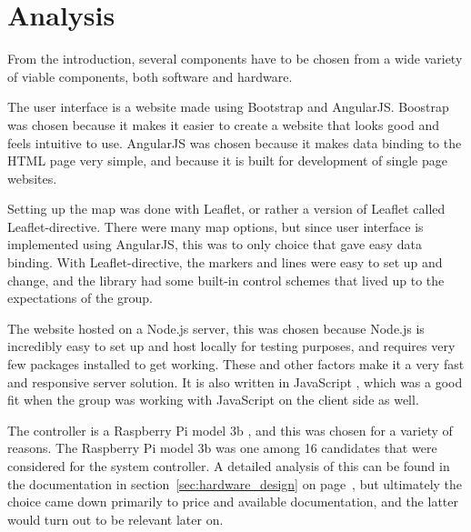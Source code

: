 \chapter{Analysis}

From the introduction, several components have to be chosen from a wide variety of viable components, both software and hardware.

The user interface is a website made using Bootstrap\cite{bootstrap} and AngularJS\cite{angular}. 
Boostrap was chosen because it makes it easier to create a website that looks good and feels intuitive to use.
AngularJS was chosen because it makes data binding to the HTML page very simple, and because it is built for development of single page websites.

Setting up the map was done with Leaflet, or rather a version of Leaflet called Leaflet-directive\cite{leaflet}. There were many map options, but since user interface is implemented using AngularJS, this was to only choice that gave easy data binding. With Leaflet-directive, the markers and lines were easy to set up and change, and the library had some built-in control schemes that lived up to the expectations of the group.

The website hosted on a Node.js server\cite{nodejs}, this was chosen because Node.js is incredibly easy to set up and host locally for testing purposes, and requires very few packages installed to get working. These and other factors make it a very fast and responsive server solution\cite{NodeJS_fast}. It is also written in JavaScript \cite{javascript}, which was a good fit when the group was working with JavaScript on the client side as well.

The controller is a Raspberry Pi model 3b \cite{rpi}, and this was chosen for a variety of reasons. The Raspberry Pi model 3b was one among 16 candidates that were considered for the system controller. A detailed analysis of this can be found in the documentation in section~\ref{sec:hardware_design} on page~\pageref{sec:hardware_design}, but ultimately the choice came down primarily to price and available documentation, and the latter would turn out to be relevant later on.

